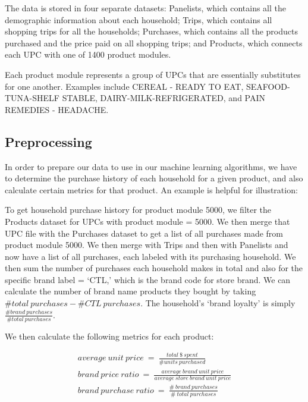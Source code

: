 \documentclass[conference]{IEEEtran}
\begin{document}
The data is stored in four separate datasets: Panelists, which contains all the demographic information about each household; Trips, which contains all shopping trips for all the households; Purchases, which contains all the products purchased and the price paid on all shopping trips; and Products, which connects each UPC with one of 1400 product modules.


Each product module represents a group of UPCs that are essentially substitutes for one another. Examples include CEREAL - READY TO EAT, SEAFOOD-TUNA-SHELF STABLE, DAIRY-MILK-REFRIGERATED, and PAIN REMEDIES - HEADACHE.

\subsection{Preprocessing}
In order to prepare our data to use in our machine learning algorithms, we have to determine the purchase history of each household for a given product, and also calculate certain metrics for that product. An example is helpful for illustration: 

To get household purchase history for product module 5000, we filter the Products dataset for UPCs with product module = 5000. We then merge that UPC file with the Purchases dataset to get a list of all purchases made from product module 5000. We then merge with Trips and then with Panelists and now have a list of all purchases, each labeled with its purchasing household. We then sum the number of purchases each household makes in total and also for the specific brand label = `CTL,' which is the brand code for store brand. We can calculate the number of brand name products they bought by taking $\# total\ purchases-\# CTL\ purchases$. The household's `brand loyalty' is simply $\frac{\#brand\ purchases}{\#total\ purchases}$. 


We then calculate the following metrics for each product:

\begin{equation*}
\begin{aligned}
average\ unit\ price\ =\ \frac{total\ \$\ spent}{\#units\ purchased} \\
brand\ price\ ratio\ =\ \frac{average\ brand\ unit\ price}{average\ store\ brand\ unit\ price} \\
brand\ purchase\ ratio\ =\ \frac{\#\ brand\ purchases}{\#\ total\ purchases}
\end{aligned}
\end{equation*}
\end{document}
